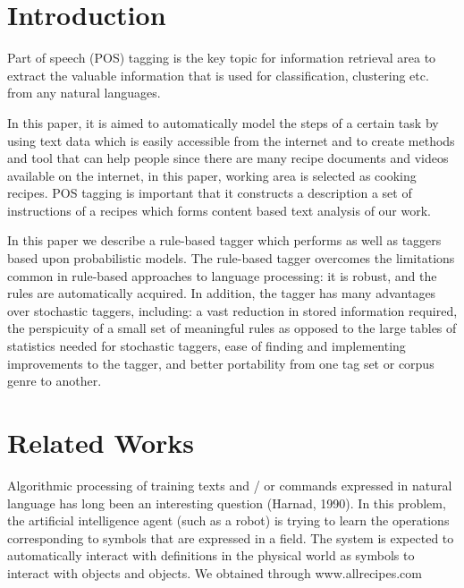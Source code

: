 
\section{Introduction}
Part of speech (POS) tagging is the key topic for information retrieval area to extract the valuable information that is used for classification, clustering etc. from any natural languages. 


In this paper, it is aimed to automatically model the steps of a certain task by using text data which is easily accessible from the internet and to create methods and tool that can help people since there are many recipe documents and videos available on the internet,  in this paper, working area is selected as cooking recipes. POS tagging is important that  it constructs a description a set of instructions of a recipes which forms content based text analysis of our work.

In this paper we describe a rule-based tagger which
performs as well as taggers based upon probabilistic
models. The rule-based tagger overcomes the limitations
common in rule-based approaches to language processing:
it is robust, and the rules are automatically acquired.
In addition, the tagger has many advantages
over stochastic taggers, including: a vast reduction in
stored information required, the perspicuity of a small
set of meaningful rules as opposed to the large tables
of statistics needed for stochastic taggers, ease of finding
and implementing improvements to the tagger, and
better portability from one tag set or corpus genre to
another. 

\section{Related Works}
Algorithmic processing of training texts and / or commands expressed in natural language has long been an interesting question (Harnad, 1990). In this problem, the artificial intelligence agent (such as a robot) is trying to learn the operations corresponding to symbols that are expressed in a field. The system is expected to automatically interact with definitions in the physical world as symbols to interact with objects and objects. We obtained through www.allrecipes.com

